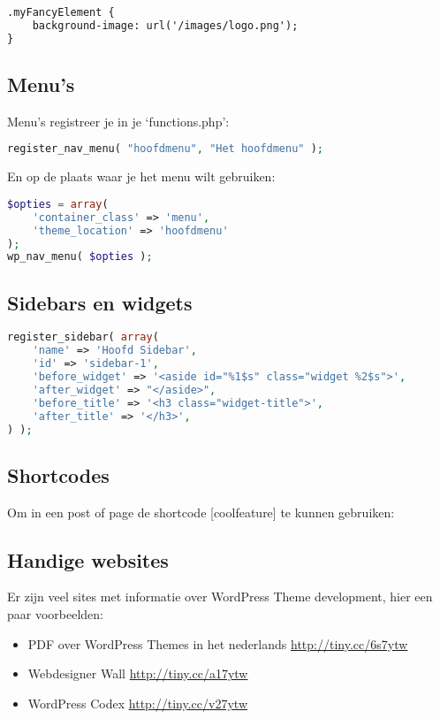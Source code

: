 \documentclass[8pt,pagesize,footinclude=false,headinclude=false]{scrartcl}
\begin{document}
\begin{multicols*}{2}
\begin{lstlisting}[language=HTML]
.myFancyElement {
	background-image: url('/images/logo.png');
}
\end{lstlisting}

\subsection*{Menu's}
Menu's registreer je in je `functions.php':
\begin{lstlisting}[language=PHP]
register_nav_menu( "hoofdmenu", "Het hoofdmenu" );
\end{lstlisting}

En op de plaats waar je het menu wilt gebruiken:
\begin{lstlisting}[language=PHP]
$opties = array( 
	'container_class' => 'menu', 
	'theme_location' => 'hoofdmenu' 
);
wp_nav_menu( $opties ); 
\end{lstlisting}

\subsection*{Sidebars en widgets}

\begin{lstlisting}[language=PHP]
register_sidebar( array(
	'name' => 'Hoofd Sidebar',
	'id' => 'sidebar-1',
	'before_widget' => '<aside id="%1$s" class="widget %2$s">',
	'after_widget' => "</aside>",
	'before_title' => '<h3 class="widget-title">',
	'after_title' => '</h3>',
) );
\end{lstlisting}

\subsection*{Shortcodes}
Om in een post of page de shortcode [coolfeature] te kunnen gebruiken:




\subsection*{Handige websites}
Er zijn veel sites met informatie over WordPress Theme development, hier een paar voorbeelden:
\begin{itemize}
	\item PDF over WordPress Themes in het nederlands \url{http://tiny.cc/6s7ytw}
	\item Webdesigner Wall \url{http://tiny.cc/a17ytw}
	\item WordPress Codex \url{http://tiny.cc/v27ytw}
\end{itemize}

\end{multicols*}
\end{document}
